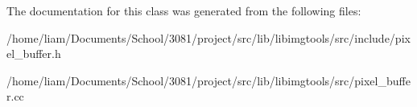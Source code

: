 The documentation for this class was generated from the following files\+:\begin{DoxyCompactItemize}
\item 
/home/liam/\+Documents/\+School/3081/project/src/lib/libimgtools/src/include/pixel\+\_\+buffer.\+h\item 
/home/liam/\+Documents/\+School/3081/project/src/lib/libimgtools/src/pixel\+\_\+buffer.\+cc\end{DoxyCompactItemize}

